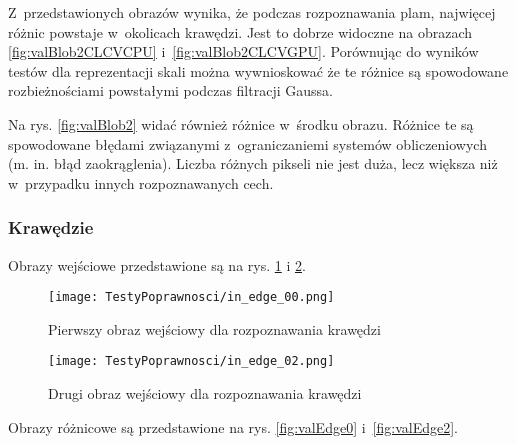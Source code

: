 Z~przedstawionych obrazów wynika, że podczas rozpoznawania plam, najwięcej różnic powstaje w~okolicach krawędzi. Jest to dobrze widoczne na obrazach \ref{fig:valBlob2CLCVCPU} i~\ref{fig:valBlob2CLCVGPU}. Porównując do wyników testów dla reprezentacji skali można wywnioskować że te różnice są spowodowane rozbieżnościami powstałymi podczas filtracji Gaussa.

Na rys. \ref{fig:valBlob2} widać również różnice w~środku obrazu. Różnice te są spowodowane błędami związanymi z~ograniczaniemi systemów obliczeniowych (m. in. błąd zaokrąglenia). Liczba różnych pikseli nie jest duża, lecz większa niż w~przypadku innych rozpoznawanych cech.


\subsubsection{Krawędzie}
\label{subsubsec:krawedzieRysunki}

Obrazy wejściowe przedstawione są na rys. \ref{fig:valEdge00} i \ref{fig:valEdge02}.

\begin{figure}[h]
\begin{center}
\texttt{[image: TestyPoprawnosci/in\_edge\_00.png]}
\end{center}
\caption{Pierwszy obraz wejściowy dla rozpoznawania krawędzi}
\label{fig:valEdge00}
\end{figure}

\begin{figure}[h]
\begin{center}
\texttt{[image: TestyPoprawnosci/in\_edge\_02.png]}
\end{center}
\caption{Drugi obraz wejściowy dla rozpoznawania krawędzi}
\label{fig:valEdge02}
\end{figure}

Obrazy różnicowe są przedstawione na rys. \ref{fig:valEdge0} i~\ref{fig:valEdge2}. 

